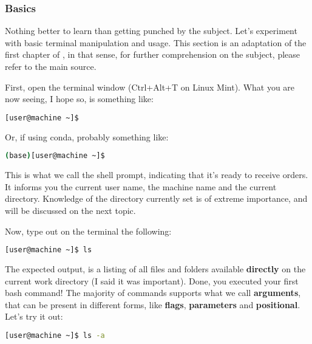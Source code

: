 \documentclass[a4paper,11pt]{article}
\begin{document}
\subsubsection{Basics}
Nothing better to learn than getting punched by the subject. Let's experiment
with basic terminal manipulation and usage. This section is an adaptation of the
first chapter of \cite{shotssLinuxCommandLine2024}, in that sense, for further
comprehension on the subject, please refer to the main source.\par
First, open the terminal window (Ctrl+Alt+T on Linux Mint). What you are now
seeing, I hope so, is something like:
\begin{lstlisting}[language=bash]
   [user@machine ~]$ 
\end{lstlisting}
Or, if using conda, probably something like:
\begin{lstlisting}[language=bash]
   (base)[user@machine ~]$ 
\end{lstlisting}
This is what we call the shell prompt, indicating that it's ready to receive
orders. It informs you the current user name, the machine name and the current
directory. Knowledge of the directory currently set is of extreme importance,
and will be discussed on the next topic.\par
Now, type out on the terminal the following:
\begin{lstlisting}[language=bash]
   [user@machine ~]$ ls
\end{lstlisting}
The expected output, is a listing of all files and folders available
\textbf{directly} on the current work directory (I said it was important). Done,
you executed your first bash command! The majority of commands supports what we
call \textbf{arguments}, that can be present in different forms, like
\textbf{flags}, \textbf{parameters} and \textbf{positional}. Let's try it out:
\begin{lstlisting}[language=bash]
   [user@machine ~]$ ls -a
\end{lstlisting}
\end{document}
